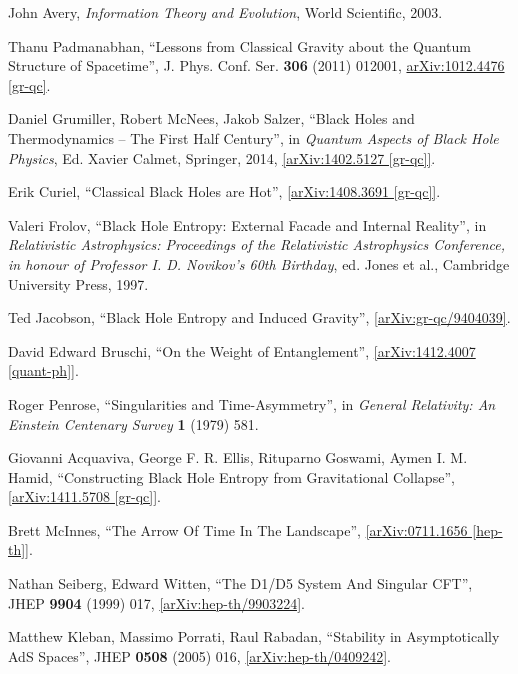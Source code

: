 \documentclass[12pt]{article}
\newcommand{\2}{$^2$}
\newcommand{\3}{$^3$}
\newcommand{\4}{$_4$}
\newcommand{\5}{$_5$}
\begin{document}
\begin{thebibliography}{400}
John Avery, \emph{Information Theory and Evolution}, World Scientific, 2003.

Thanu Padmanabhan, ``Lessons from Classical Gravity about the Quantum Structure of Spacetime'', J. Phys. Conf. Ser. \textbf{306} (2011) 012001, \href{http://arxiv.org/abs/1012.4476}{arXiv:1012.4476 [gr-qc]}.

Daniel Grumiller, Robert McNees, Jakob Salzer, ``Black Holes and Thermodynamics -- The First Half Century'', in \emph{ Quantum Aspects of Black Hole Physics}, Ed. Xavier Calmet, Springer, 2014, \href{http://arxiv.org/abs/1402.5127}{[arXiv:1402.5127 [gr-qc]]}.

Erik Curiel, ``Classical Black Holes are Hot'', \href{http://arxiv.org/abs/1408.3691}{[arXiv:1408.3691 [gr-qc]]}.

Valeri Frolov, ``Black Hole Entropy: External Facade and Internal Reality'', in \emph{Relativistic Astrophysics: Proceedings of the Relativistic Astrophysics Conference, in honour of Professor I. D.  Novikov's 60th Birthday}, ed. Jones et al., Cambridge University Press, 1997.

Ted Jacobson, ``Black Hole Entropy and Induced Gravity'', \href{http://arxiv.org/abs/gr-qc/9404039}{[arXiv:gr-qc/9404039]}.

David Edward Bruschi, ``On the Weight of Entanglement'', \href{http://arxiv.org/abs/1412.4007}{[arXiv:1412.4007 [quant-ph]]}.

Roger Penrose, ``Singularities and Time-Asymmetry'', in \emph{General Relativity: An Einstein Centenary Survey} \textbf{1} (1979) 581.

Giovanni Acquaviva, George F. R. Ellis, Rituparno Goswami, Aymen I. M. Hamid, ``Constructing Black Hole Entropy from Gravitational Collapse'', \href{http://arxiv.org/abs/1411.5708}{[arXiv:1411.5708 [gr-qc]]}.

Brett McInnes, ``The Arrow Of Time In The Landscape'', \href{http://arxiv.org/abs/0711.1656}{[arXiv:0711.1656 [hep-th]]}.


Nathan Seiberg, Edward Witten, ``The D1/D5 System And Singular CFT'',
JHEP \textbf{9904} (1999) 017, \href{http://arxiv.org/abs/hep-th/9903224}{[arXiv:hep-th/9903224]}.

Matthew Kleban, Massimo Porrati, Raul Rabadan, ``Stability in Asymptotically AdS Spaces'', JHEP \textbf{0508} (2005) 016, \href{http://arxiv.org/abs/hep-th/0409242}{[arXiv:hep-th/0409242]}.


\end{thebibliography}
\end{document}
